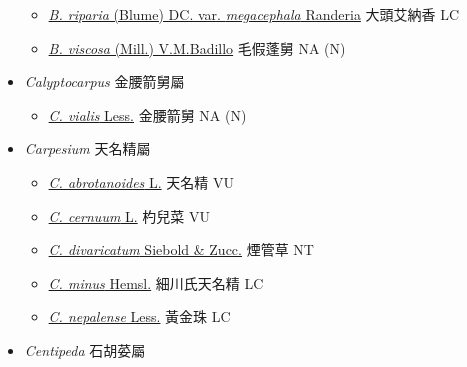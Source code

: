\begin{itemize}
\begin{itemize}
        \item[] \href{http://www.theplantlist.org/tpl1.1/search?q=Blumea+riparia+var.+megacephala}{\textit{B. riparia} (Blume) DC. var. \textit{megacephala} Randeria}   大頭艾納香   LC
        \item[] \href{http://www.theplantlist.org/tpl1.1/search?q=Blumea+viscosa}{\textit{B. viscosa} (Mill.) V.M.Badillo}   毛假蓬舅   NA (N)
  \end{itemize}
 \item[] \textit{Calyptocarpus} 金腰箭舅屬
                                
  \begin{itemize}
        \item[] \href{http://www.theplantlist.org/tpl1.1/search?q=Calyptocarpus+vialis}{\textit{C. vialis} Less.}   金腰箭舅   NA (N)
  \end{itemize}
 \item[] \textit{Carpesium} 天名精屬
                                
  \begin{itemize}
        \item[] \href{http://www.theplantlist.org/tpl1.1/search?q=Carpesium+abrotanoides}{\textit{C. abrotanoides} L.}   天名精   VU
        \item[] \href{http://www.theplantlist.org/tpl1.1/search?q=Carpesium+cernuum}{\textit{C. cernuum} L.}   杓兒菜   VU
        \item[] \href{http://www.theplantlist.org/tpl1.1/search?q=Carpesium+divaricatum}{\textit{C. divaricatum} Siebold \& Zucc.}   煙管草   NT
        \item[] \href{http://www.theplantlist.org/tpl1.1/search?q=Carpesium+minus}{\textit{C. minus} Hemsl.}   細川氏天名精   LC
        \item[] \href{http://www.theplantlist.org/tpl1.1/search?q=Carpesium+nepalense}{\textit{C. nepalense} Less.}   黃金珠   LC
  \end{itemize}
 \item[] \textit{Centipeda} 石胡荽屬
                                

\end{itemize}
